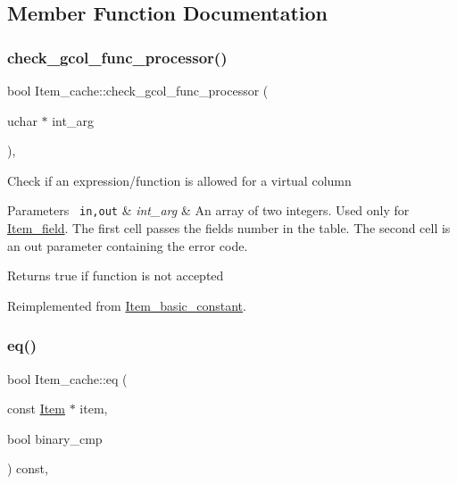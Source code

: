 \subsection{Member Function Documentation}
\mbox{\label{classItem__cache_ae62bc37e1839d9749fdd70c485506c5f}} 
\subsubsection{\texorpdfstring{check\+\_\+gcol\+\_\+func\+\_\+processor()}{check\_gcol\_func\_processor()}}
{\footnotesize\ttfamily bool Item\+\_\+cache\+::check\+\_\+gcol\+\_\+func\+\_\+processor (\begin{DoxyParamCaption}\item[{uchar $\ast$}]{int\+\_\+arg }\end{DoxyParamCaption})\hspace{0.3cm}{\ttfamily [inline]}, {\ttfamily [virtual]}}

Check if an expression/function is allowed for a virtual column


\begin{DoxyParams}[1]{Parameters}
\mbox{\texttt{ in,out}}  & {\em int\+\_\+arg} & An array of two integers. Used only for \mbox{\hyperlink{classItem__field}{Item\+\_\+field}}. The first cell passes the field\textquotesingle{}s number in the table. The second cell is an out parameter containing the error code.\\
\hline
\end{DoxyParams}
\begin{DoxyReturn}{Returns}
true if function is not accepted 
\end{DoxyReturn}


Reimplemented from \mbox{\hyperlink{classItem__basic__constant_a6240f3253090d2fc91f87a7a1cb773a7}{Item\+\_\+basic\+\_\+constant}}.

\mbox{\label{classItem__cache_a77bf4f66aca1a46aeca8ba732eed78ce}} 
\subsubsection{\texorpdfstring{eq()}{eq()}}
{\footnotesize\ttfamily bool Item\+\_\+cache\+::eq (\begin{DoxyParamCaption}\item[{const \mbox{\hyperlink{classItem}{Item}} $\ast$}]{item,  }\item[{bool}]{binary\+\_\+cmp }\end{DoxyParamCaption}) const\hspace{0.3cm}{\ttfamily [inline]}, {\ttfamily [virtual]}}

